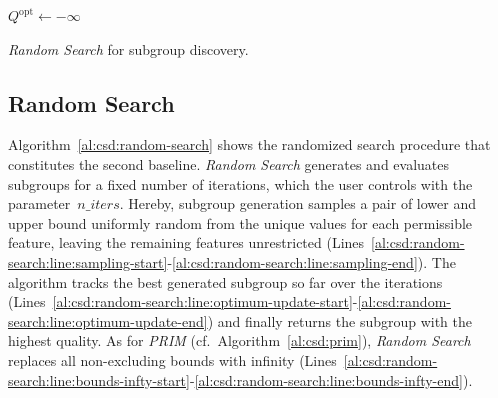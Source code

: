 \documentclass{article}
\theoremstyle{definition}
\begin{document}
\begin{algorithm}[t]
	\DontPrintSemicolon
	\BlankLine
	$Q^{\text{opt}} \leftarrow - \infty$\;
	\caption{\emph{Random Search} for subgroup discovery.}
	\label{al:csd:random-search}
\end{algorithm}

\subsection{Random Search}
\label{sec:csd:baselines:random-search}

Algorithm~\ref{al:csd:random-search} shows the randomized search procedure that constitutes the second baseline.
\emph{Random Search} generates and evaluates subgroups for a fixed number of iterations, which the user controls with the parameter~$\mathit{n\_iters}$.
Hereby, subgroup generation samples a pair of lower and upper bound uniformly random from the unique values for each permissible feature, leaving the remaining features unrestricted (Lines~\ref{al:csd:random-search:line:sampling-start}-\ref{al:csd:random-search:line:sampling-end}).
The algorithm tracks the best generated subgroup so far over the iterations (Lines~\ref{al:csd:random-search:line:optimum-update-start}-\ref{al:csd:random-search:line:optimum-update-end}) and finally returns the subgroup with the highest quality.
As for \emph{PRIM} (cf.~Algorithm~\ref{al:csd:prim}), \emph{Random Search} replaces all non-excluding bounds with infinity (Lines~\ref{al:csd:random-search:line:bounds-infty-start}-\ref{al:csd:random-search:line:bounds-infty-end}).
\end{document}
